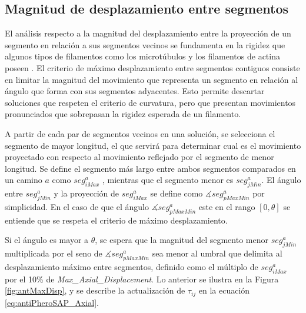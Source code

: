 \subsection{Magnitud de desplazamiento entre segmentos}
\label{subsec:magnitudDesplazamientoSegs}
El an\'alisis respecto a la magnitud del desplazamiento entre la proyecci\'on de un segmento en relaci\'on a sus segmentos vecinos se fundamenta en la rigidez que algunos tipos de filamentos como los microt\'ubulos y los filamentos de actina poseen . El criterio de m\'aximo desplazamiento entre segmentos contiguos consiste en limitar la magnitud del movimiento que representa un segmento en relaci\'on al \'angulo que forma con sus segmentos adyacentes. Esto permite descartar soluciones que respeten el criterio de curvatura, pero que presentan movimientos pronunciados que sobrepasan la rigidez esperada de un filamento.

A partir de cada par de segmentos vecinos en una soluci\'on, se  selecciona el segmento de mayor longitud, el que servir\'a para determinar cual es el movimiento proyectado con respecto al movimiento reflejado por el segmento de menor longitud. Se define el segmento m\'as largo entre ambos segmentos comparados en un camino $a$ como $seg^{a}_{iMax}$ , mientras que el segmento menor es $seg^{a}_{jMin}$. El \'angulo entre $seg^{a}_{jMin}$ y la proyecci\'on de $seg^{a}_{iMax}$ se define como 
$\measuredangle seg^{a}_{pMaxMin}$ por simplicidad. En el caso de que el \'angulo $\measuredangle seg^{a}_{pMaxMin}$ este en el rango $[0, \theta]$ se entiende que se respeta el criterio de m\'aximo desplazamiento.


Si el \'angulo es mayor a $\theta$, se espera que la magnitud del segmento menor $seg^{a}_{jMin}$ multiplicada por el seno de $\measuredangle seg^{a}_{pMaxMin}$ sea menor al umbral que delimita al desplazamiento m\'aximo entre segmentos, definido como el m\'ultiplo de $seg^{a}_{iMax}$ por el 10\% de {\it Max\_Axial\_Displacement}. Lo anterior se ilustra en la Figura \ref{fig:antMaxDisp}, y se describe la actualizaci\'on de $\tau_{ij}$ en la ecuaci\'on \ref{eq:antiPheroSAP_Axial}.

